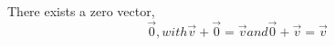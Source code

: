 \documentclass[preview]{standalone}
\begin{document}
\begin{center}
There exists a zero vector, \[\overrightarrow{0}, with \overrightarrow{v} + \overrightarrow{0} = \overrightarrow{v} and \overrightarrow{0} + \overrightarrow{v} = \overrightarrow{v}\]
\end{center}
\end{document}
